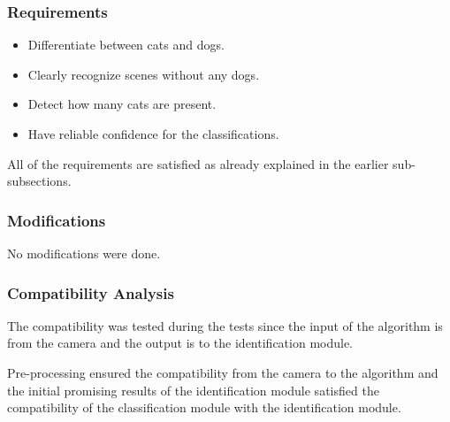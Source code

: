 \subsubsection{Requirements}

\begin{itemize}
    \item Differentiate between cats and dogs.
    \item Clearly recognize scenes without any dogs. 
    \item Detect how many cats are present.
    \item Have reliable confidence for the classifications.
\end{itemize}

All of the requirements are satisfied as already explained in the earlier sub-subsections. 

\subsubsection{Modifications}

No modifications were done. 

\subsubsection{Compatibility Analysis}

The compatibility was tested during the tests since the input of the algorithm is from the camera and the output is to the identification module. 

Pre-processing ensured the compatibility from the camera to the algorithm and the initial promising results of the identification module satisfied the compatibility of the classification module with the identification module. 
